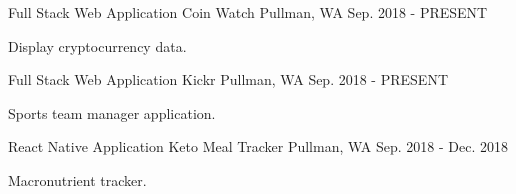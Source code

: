 \begin{cventries}
  \cventry
    {Full Stack Web Application}
    {Coin Watch}
    {Pullman, WA}
    {Sep. 2018 - PRESENT}
    {
      \begin{cvitems}
        \item {Display cryptocurrency data.}
      \end{cvitems}
    }
  \cventry
    {Full Stack Web Application}
    {Kickr}
    {Pullman, WA}
    {Sep. 2018 - PRESENT}
    {
      \begin{cvitems}
        \item {Sports team manager application.}
      \end{cvitems}
    }
    \cventry
    {React Native Application}
    {Keto Meal Tracker}
    {Pullman, WA}
    {Sep. 2018 - Dec. 2018}
    {
      \begin{cvitems}
        \item {Macronutrient tracker.}
      \end{cvitems}
    }
\end{cventries}
